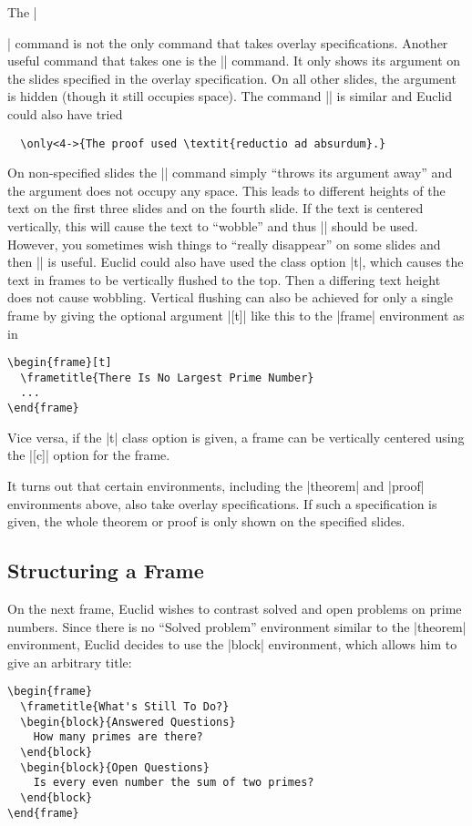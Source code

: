 The |\item| command is not the only command that takes overlay specifications. Another useful command that takes one is the |\uncover| command. It only shows its argument on the slides specified in the overlay specification. On all other slides, the argument is hidden (though it still occupies space). The command |\only| is similar and Euclid could also have tried
\begin{verbatim}
  \only<4->{The proof used \textit{reductio ad absurdum}.}
\end{verbatim}

On non-specified slides the |\only| command simply ``throws its argument away'' and the argument does not occupy any space. This leads to different heights of the text on the first three slides and on the fourth slide. If the text is centered vertically, this will cause the text to ``wobble'' and thus |\uncover| should be used. However, you sometimes wish things to ``really disappear'' on some slides and then |\only| is useful. Euclid could also have used the class option |t|, which causes the text in frames to be vertically flushed to the top. Then a differing text height does not cause wobbling. Vertical flushing can also be achieved for only a single frame by giving the optional argument |[t]| like this to the |frame| environment as in
\begin{verbatim}
\begin{frame}[t]
  \frametitle{There Is No Largest Prime Number}
  ...
\end{frame}
\end{verbatim}
Vice versa, if the |t| class option is given, a frame can be vertically centered using the |[c]| option for the frame.

It turns out that certain environments, including the |theorem| and |proof| environments above, also take overlay specifications. If such a specification is given, the whole theorem or proof is only shown on the specified slides.


\subsection{Structuring a Frame}

On the next frame, Euclid wishes to contrast solved and open problems on prime numbers. Since there is no ``Solved problem'' environment similar to the |theorem| environment, Euclid decides to use the |block| environment, which allows him to give an arbitrary title:
\begin{verbatim}
\begin{frame}
  \frametitle{What's Still To Do?}
  \begin{block}{Answered Questions}
    How many primes are there?
  \end{block}
  \begin{block}{Open Questions}
    Is every even number the sum of two primes?
  \end{block}
\end{frame}
\end{verbatim}

